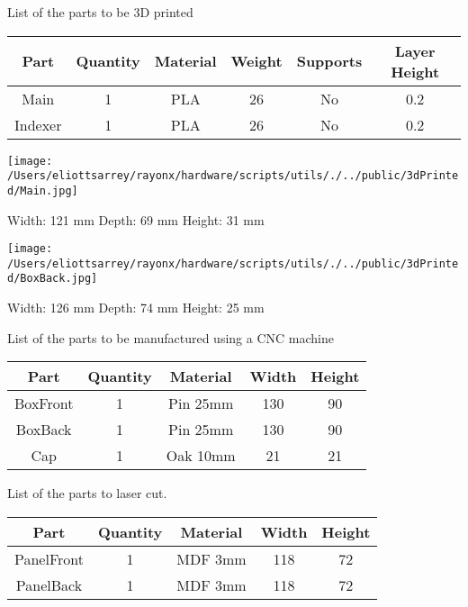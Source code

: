 \documentclass{article}%
\begin{document}
\vspace*{4mm}%
\linebreak%
\subtitle{3D Prints}%
\linebreak%
\vspace*{4mm}%
List of the parts to be 3D printed%
\begin{longtable}{c|c|c|c|c|c}%
\textbf{Part}&\textbf{Quantity}&\textbf{Material}&\textbf{Weight}&\textbf{Supports}&\textbf{Layer Height}\\%
\hline%
Main&1&PLA&26&No&0.2\\%
Indexer&1&PLA&26&No&0.2\\%
\end{longtable}%
\linebreak%
\begin{minipage}{8.5cm}%
\centering%
%
\linebreak%
\begin{minipage}{8.5cm}%
\centering%
\texttt{[image: /Users/eliottsarrey/rayonx/hardware/scripts/utils/./../public/3dPrinted/Main.jpg]}%
\end{minipage}%
\linebreak%
Width: 121 mm%
\linebreak%
Depth: 69 mm%
\linebreak%
Height: 31 mm%
\end{minipage}%
\begin{minipage}{8.5cm}%
\centering%
%
\linebreak%
\begin{minipage}{8.5cm}%
\centering%
\texttt{[image: /Users/eliottsarrey/rayonx/hardware/scripts/utils/./../public/3dPrinted/BoxBack.jpg]}%
\end{minipage}%
\linebreak%
\linebreak%
Width: 126 mm%
\linebreak%
Depth: 74 mm%
\linebreak%
Height: 25 mm%
\end{minipage}%
\vspace*{4mm}%
\linebreak%
\vspace*{4mm}%
\subtitle{CNC Machine}%
\linebreak%
\vspace*{4mm}%
List of the parts to be manufactured using a CNC machine%
\begin{longtable}{c|c|c|c|c}%
\textbf{Part}&\textbf{Quantity}&\textbf{Material}&\textbf{Width}&\textbf{Height}\\%
\hline%
BoxFront&1&Pin 25mm&130&90\\%
BoxBack&1&Pin 25mm&130&90\\%
Cap&1&Oak 10mm&21&21\\%
\end{longtable}%
\subtitle{Laser Cutting}%
\linebreak%
List of the parts to laser cut.%
\begin{longtable}{c|c|c|c|c}%
\textbf{Part}&\textbf{Quantity}&\textbf{Material}&\textbf{Width}&\textbf{Height}\\%
\hline%
PanelFront&1&MDF 3mm&118&72\\%
PanelBack&1&MDF 3mm&118&72\\%
\end{longtable}%
\end{document}

